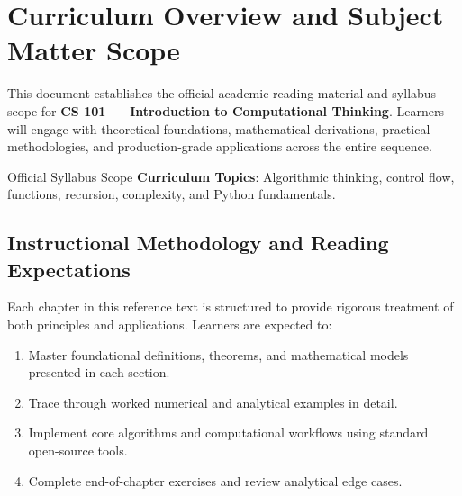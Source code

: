 \section{Curriculum Overview and Subject Matter Scope}

This document establishes the official academic reading material and syllabus scope for \textbf{CS 101 --- Introduction to Computational Thinking}. Learners will engage with theoretical foundations, mathematical derivations, practical methodologies, and production-grade applications across the entire sequence.

\begin{InsightBox}{Official Syllabus Scope}
  \textbf{Curriculum Topics}: Algorithmic thinking, control flow, functions, recursion, complexity, and Python fundamentals.
\end{InsightBox}

\subsection{Instructional Methodology and Reading Expectations}

Each chapter in this reference text is structured to provide rigorous treatment of both principles and applications. Learners are expected to:
\begin{enumerate}
  \item Master foundational definitions, theorems, and mathematical models presented in each section.
  \item Trace through worked numerical and analytical examples in detail.
  \item Implement core algorithms and computational workflows using standard open-source tools.
  \item Complete end-of-chapter exercises and review analytical edge cases.
\end{enumerate}

